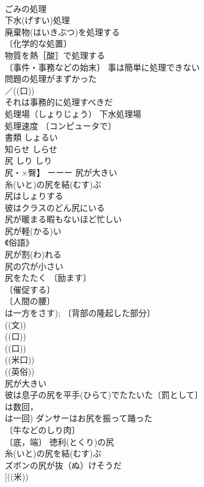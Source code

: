 \documentclass[8pt]{extreport}
\begin{document}
\begin{CJK}{UTF8}{min}
\\	ごみの処理 
\\	下水(げすい)処理 
\\	廃棄物(はいきぶつ)を処理する 
\\	〔化学的な処置〕
\\	物質を熱［酸］で処理する 
\\	〔事件・事務などの始末〕 事は簡単に処理できない 
\\	問題の処理がまずかった 
\\	／((口)) 
\\	それは事務的に処理すべきだ 
\\	処理場（しょりじょう） 下水処理場 
\\	処理速度 〔コンピュータで〕
\\	書類	しょるい	
\\	知らせ	しらせ	
\\	尻	しり	しり
\\	尻・×臀】 ーーー 尻が大きい 
\\	糸(いと)の尻を結(むす)ぶ 
\\	尻はしょりする 
\\	彼はクラスのどん尻にいる 
\\	尻が暖まる暇もないほど忙しい 
\\	尻が軽(かる)い 
\\	《俗語》 
\\	尻が割(わ)れる 
\\	尻の穴が小さい 
\\	尻をたたく 〔励ます〕
\\	〔催促する〕
\\	〔人間の腰〕
\\	は一方をさす); 〔背部の隆起した部分〕
\\	((文)) 
\\	((口)) 
\\	((口)) 
\\	((米口))
\\	((英俗))
\\	尻が大きい 
\\	彼は息子の尻を平手(ひらて)でたたいた〔罰として〕 
\\	は数回，
\\	は一回) ダンサーはお尻を振って踊った 
\\	〔牛などのしり肉〕
\\	〔底，端〕 徳利(とくり)の尻 
\\	糸(いと)の尻を結(むす)ぶ 
\\	ズボンの尻が抜（ぬ）けそうだ 
\\	[((米)) 

\end{CJK}
\end{document}
